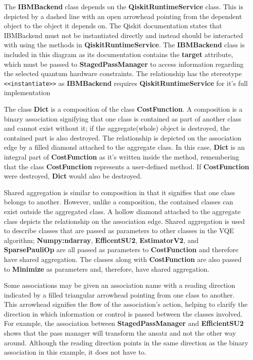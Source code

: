 \documentclass{article}
\begin{document}
The \textbf{IBMBackend} class depends on the \textbf{QiskitRuntimeService} class. This is depicted by a dashed line with an open arrowhead pointing from the dependent object to the object it depends on. The Qiskit documentation states that IBMBackend must not be instantiated directly and instead should be interacted with using the methods in \textbf{QiskitRuntimeService}\cite{IBMBackend}. The \textbf{IBMBackend} class is included in this diagram as its documentation contains the \textbf{target} attribute, which must be passed to \textbf{StagedPassManager} to access information regarding the selected quantum hardware constraints. The relationship has the stereotype \texttt{<<instantiate>>} as \textbf{IBMBackend} requires \textbf{QiskitRuntimeService} for it's full implementation\cite{Dependencyrelationships}

The class \textbf{Dict} is a composition of the class \textbf{CostFunction}. A composition is a binary association signifying that one class is contained as part of another class and cannot exist without it; if the aggregate(whole) object is destroyed, the contained part is also destroyed\cite{UMLComposition}. The relationship is depicted on the association edge by a filled diamond attached to the aggregate class. In this case, \textbf{Dict} is an integral part of \textbf{CostFunction} as it's written inside the method, remembering that the class \textbf{CostFunction} represents a user-defined method. If \textbf{CostFunction} were destroyed, \textbf{Dict} would also be destroyed.

Shared aggregation is similar to composition in that it signifies that one class belongs to another\cite{Seidl_Scholz_Huemer_Kappel_Duffy_2014}. However, unlike a composition, the contained classes can exist outside the aggregated class. A hollow diamond attached to the aggregate class depicts the relationship on the association edge. Shared aggregation is used to describe classes that are passed as parameters to other classes in the VQE algorithm; \textbf{Numpy:ndarray}, \textbf{EfficentSU2}, \textbf{EstimatorV2}, and \textbf{SparsePauliOp} are all passed as parameters to \textbf{CostFunction} and therefore have shared aggregation. The classes along with \textbf{CostFunction} are also passed to \textbf{Minimize} as parameters and, therefore, have shared aggregation. 

Some associations may be given an association name with a reading direction indicated by a filled triangular arrowhead pointing from one class to another. This arrowhead signifies the flow of the association's action, helping to clarify the direction in which information or control is passed between the classes involved. For example, the association between \textbf{StagedPassManager} and \textbf{EfficientSU2} shows that the pass manager will transform the ansatz and not the other way around. Although the reading direction points in the same direction as the binary association in this example, it does not have to\cite{Seidl_Scholz_Huemer_Kappel_Duffy_2014}.
\end{document}
